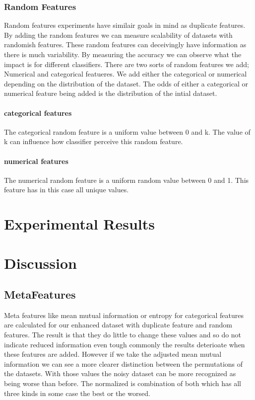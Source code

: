 \documentclass[a4paper,10pt]{article}
\begin{document}
\subsubsection{Random Features}
Random features experiments have similair goals in mind as duplicate features. By adding the random features we can measure scalability of datasets with randomish features. These random features can deceivingly have information as there is much variability. By measuring the accuracy we can observe what the impact is for different classifiers. There are two sorts of random features we add; Numerical and categorical featueres. We add either the categorical or numerical depending on the distribution of the dataset. The odds of either a categorical or numerical feature being added is the distribution of the intial dataset. %
 
\paragraph{categorical features}
The categorical random feature is a uniform value between 0 and k. The value of k can influence how classifier perceive this random feature.
\paragraph{numerical features}
The numerical random feature is a uniform random value between 0 and 1. This feature has in this case all unique values.
\newpage 

\section{Experimental Results} \label{Chapter4}



\section{Discussion} \label{Chapter5}


\subsection{MetaFeatures}
Meta features like mean mutual information or entropy for categorical features are calculated for our enhanced dataset with duplicate feature and random features. The result is that they do little to change these values and so do not indicate reduced information even tough commonly the results deterioate when these features are added. However if we take the adjusted mean mutual information we can see a more clearer distinction between the permutations of the datasets. With those values the noisy dataset can be more recognized as being worse than before. The normalized  is combination of both which has all three kinds in some case the best or the worsed.
\end{document}

